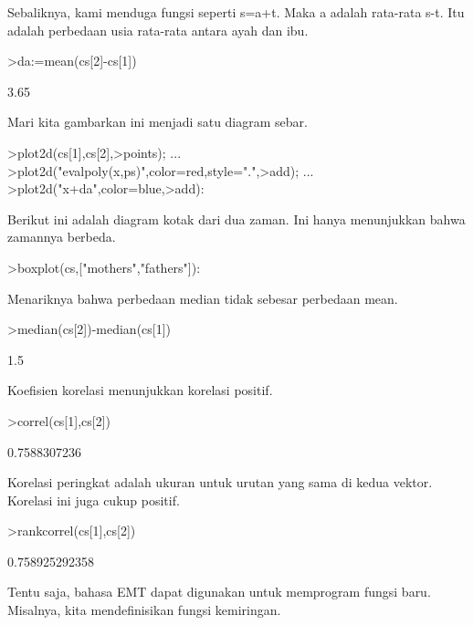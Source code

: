 \documentclass[a4paper,10pt]{article}
\begin{document}
\begin{eulernotebook}
\begin{eulercomment}
Sebaliknya, kami menduga fungsi seperti s=a+t. Maka a adalah rata-rata
s-t. Itu adalah perbedaan usia rata-rata antara ayah dan ibu.
\end{eulercomment}
\begin{eulerprompt}
>da:=mean(cs[2]-cs[1])
\end{eulerprompt}
\begin{euleroutput}
  3.65
\end{euleroutput}
\begin{eulercomment}
Mari kita gambarkan ini menjadi satu diagram sebar.
\end{eulercomment}
\begin{eulerprompt}
>plot2d(cs[1],cs[2],>points);  ...
>plot2d("evalpoly(x,ps)",color=red,style=".",>add);  ...
>plot2d("x+da",color=blue,>add):
\end{eulerprompt}
\begin{eulercomment}
Berikut ini adalah diagram kotak dari dua zaman. Ini hanya menunjukkan
bahwa zamannya berbeda.
\end{eulercomment}
\begin{eulerprompt}
>boxplot(cs,["mothers","fathers"]):
\end{eulerprompt}
\begin{eulercomment}
Menariknya bahwa perbedaan median tidak sebesar perbedaan mean.
\end{eulercomment}
\begin{eulerprompt}
>median(cs[2])-median(cs[1])
\end{eulerprompt}
\begin{euleroutput}
  1.5
\end{euleroutput}
\begin{eulercomment}
Koefisien korelasi menunjukkan korelasi positif.
\end{eulercomment}
\begin{eulerprompt}
>correl(cs[1],cs[2])
\end{eulerprompt}
\begin{euleroutput}
  0.7588307236
\end{euleroutput}
\begin{eulercomment}
Korelasi peringkat adalah ukuran untuk urutan yang sama di kedua
vektor. Korelasi ini juga cukup positif.
\end{eulercomment}
\begin{eulerprompt}
>rankcorrel(cs[1],cs[2])
\end{eulerprompt}
\begin{euleroutput}
  0.758925292358
\end{euleroutput}
\begin{eulercomment}
Tentu saja, bahasa EMT dapat digunakan untuk memprogram fungsi baru.
Misalnya, kita mendefinisikan fungsi kemiringan.


\end{eulercomment}
\end{eulernotebook}
\end{document}
